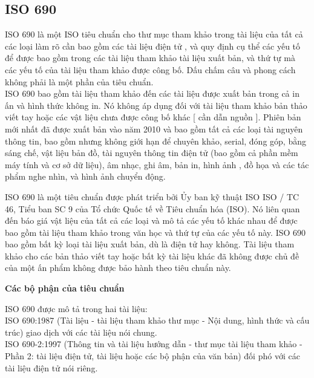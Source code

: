 \documentclass{hcmutarticle}
\begin{document}
\subsection{ISO 690}
    ISO 690 là một ISO tiêu chuẩn cho thư mục tham khảo trong tài liệu của tất cả các loại  làm rõ cần bao gồm các tài liệu điện tử , và quy định cụ thể các yếu tố để được bao gồm trong các tài liệu tham khảo tài liệu xuất bản, và thứ tự mà các yếu tố của tài liệu tham khảo được công bố. Dấu chấm câu và phong cách không phải là một phần của tiêu chuẩn.\\

ISO 690 bao gồm tài liệu tham khảo đến các tài liệu được xuất bản trong cả in ấn và hình thức không in. Nó không áp dụng đối với tài liệu tham khảo bản thảo viết tay hoặc các vật liệu chưa được công bố khác [ cần dẫn nguồn ]. Phiên bản mới nhất đã được xuất bản vào năm 2010 và bao gồm tất cả các loại tài nguyên thông tin, bao gồm nhưng không giới hạn để chuyên khảo, serial, đóng góp, bằng sáng chế, vật liệu bản đồ, tài nguyên thông tin điện tử (bao gồm cả phần mềm máy tính và cơ sở dữ liệu), âm nhạc, ghi âm, bản in, hình ảnh , đồ họa và các tác phẩm nghe nhìn, và hình ảnh chuyển động.




ISO 690 là một tiêu chuẩn được phát triển bởi Ủy ban kỹ thuật ISO ISO / TC 46, Tiểu ban SC 9 của Tổ chức Quốc tế về Tiêu chuẩn hóa (ISO). Nó liên quan đến báo giá vật liệu của tất cả các loại và mô tả các yếu tố khác nhau để được bao gồm tài liệu tham khảo trong văn học và thứ tự của các yếu tố này.
ISO 690 bao gồm bất kỳ loại tài liệu xuất bản, dù là điện tử hay không. Tài liệu tham khảo cho các bản thảo viết tay hoặc bất kỳ tài liệu khác đã không được chủ đề của một ấn phẩm không được bảo hành theo tiêu chuẩn này.

\textbf{ Các bộ phận của tiêu chuẩn}

ISO 690 được mô tả trong hai tài liệu:\\
ISO 690:1987 (Tài liệu - tài liệu tham khảo thư mục - Nội dung, hình thức và cấu trúc) giao dịch với các tài liệu nói chung.\\
ISO 690-2:1997 (Thông tin và tài liệu hướng dẫn - thư mục tài liệu tham khảo - Phần 2: tài liệu điện tử, tài liệu hoặc các bộ phận của văn bản) đối phó với các tài liệu điện tử nói riêng.
\end{document}
